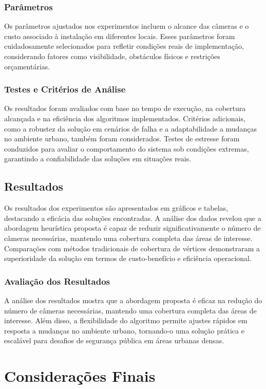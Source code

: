 \documentclass[12pt, a4paper]{report}
\begin{document}
\subsection{Parâmetros}
Os parâmetros ajustados nos experimentos incluem o alcance das câmeras e o custo associado à instalação em diferentes locais. Esses parâmetros foram cuidadosamente selecionados para refletir condições reais de implementação, considerando fatores como visibilidade, obstáculos físicos e restrições orçamentárias.

\subsection{Testes e Critérios de Análise}
Os resultados foram avaliados com base no tempo de execução, na cobertura alcançada e na eficiência dos algoritmos implementados. Critérios adicionais, como a robustez da solução em cenários de falha e a adaptabilidade a mudanças no ambiente urbano, também foram considerados. Testes de estresse foram conduzidos para avaliar o comportamento do sistema sob condições extremas, garantindo a confiabilidade das soluções em situações reais.

\section{Resultados}
Os resultados dos experimentos são apresentados em gráficos e tabelas, destacando a eficácia das soluções encontradas. A análise dos dados revelou que a abordagem heurística proposta é capaz de reduzir significativamente o número de câmeras necessárias, mantendo uma cobertura completa das áreas de interesse. Comparações com métodos tradicionais de cobertura de vértices demonstraram a superioridade da solução em termos de custo-benefício e eficiência operacional.

\subsection{Avaliação dos Resultados}
A análise dos resultados mostra que a abordagem proposta é eficaz na redução do número de câmeras necessárias, mantendo uma cobertura completa das áreas de interesse. Além disso, a flexibilidade do algoritmo permite ajustes rápidos em resposta a mudanças no ambiente urbano, tornando-o uma solução prática e escalável para desafios de segurança pública em áreas urbanas densas.

\chapter{Considerações Finais}
\end{document}
